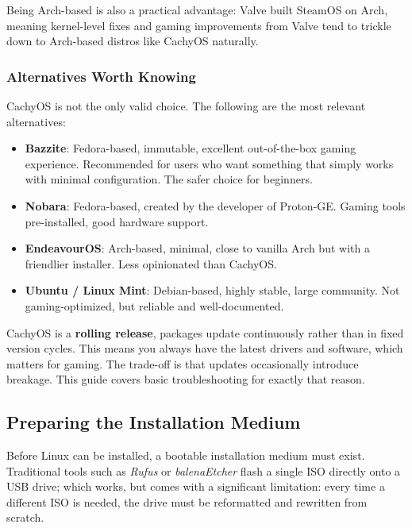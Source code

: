 \documentclass{article}
\begin{document}
Being Arch-based is also a practical advantage: Valve built SteamOS on Arch, meaning kernel-level fixes and gaming improvements from Valve tend to trickle down to
Arch-based distros like CachyOS naturally.

\subsubsection{Alternatives Worth Knowing}

CachyOS is not the only valid choice. The following are the most relevant alternatives:

\begin{itemize}[leftmargin=1.5em, label={\tiny\textbullet}, nosep]
  \item \textbf{Bazzite}: Fedora-based, immutable, excellent out-of-the-box gaming
    experience. Recommended for users who want something that simply works with minimal
    configuration. The safer choice for beginners.
  \item \textbf{Nobara}: Fedora-based, created by the developer of Proton-GE.
    Gaming tools pre-installed, good hardware support.
  \item \textbf{EndeavourOS}: Arch-based, minimal, close to vanilla Arch but with
    a friendlier installer. Less opinionated than CachyOS.
  \item \textbf{Ubuntu / Linux Mint}: Debian-based, highly stable, large community. Not gaming-optimized, but reliable and well-documented.
\end{itemize}

\begin{tcolorbox}[arc=12pt, outer arc=10pt,
  colback=blue!4!white, colframe=blue!40!black,
  title=\textbf{Rolling Release vs.\ Stable Release}]
  CachyOS is a \textbf{rolling release}, packages update continuously rather than
  in fixed version cycles. This means you always have the latest drivers and software,
  which matters for gaming. The trade-off is that updates occasionally introduce
  breakage. This guide covers basic troubleshooting for exactly that reason.
\end{tcolorbox}

\subsection{Preparing the Installation Medium}

Before Linux can be installed, a bootable installation medium must exist. Traditional tools such as \textit{Rufus} or \textit{balenaEtcher} flash a single ISO directly onto a USB drive; which works, but comes with a significant limitation: every time a different ISO is needed, the drive must be reformatted and rewritten from scratch.
\end{document}
